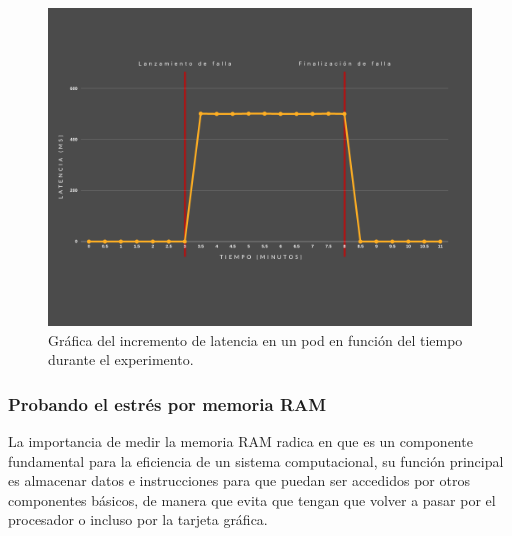  \begin{figure}[htpb!]
	\centering
	\includegraphics[width=0.95\columnwidth]{images/graficaspruebas/ping.png}
	\caption{Gráfica del incremento de latencia en un pod en función del tiempo durante el experimento.}
	\label{fig:ping01}
\end{figure}

\subsubsection{Probando el estrés por memoria RAM}


\par La importancia de medir la memoria RAM radica en que es un componente fundamental para la eficiencia de un sistema computacional, su función principal es almacenar datos e instrucciones para que puedan ser accedidos por otros componentes básicos, de manera que evita que tengan que volver a pasar por el procesador o incluso por la tarjeta gráfica. \\


